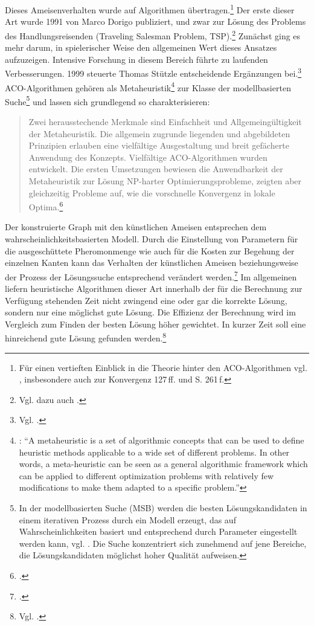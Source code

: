 Dieses Ameisenverhalten wurde auf Algorithmen übertragen.\footnote{Für einen vertieften Einblick in die Theorie hinter den ACO-Algorithmen vgl. \citet*[S. 121\,ff.]{ds-ant}, insbesondere auch zur Konvergenz 127\,ff. und S. 261\,f.} Der erste dieser Art wurde 1991 von Marco Dorigo publiziert, und zwar zur Lösung des Problems des Handlungsreisenden (Traveling Salesman Problem, TSP).\footnote{Vgl. dazu auch \citet*[S. 65\,ff.]{ds-ant}.} Zunächst ging es mehr darum, in spielerischer Weise den allgemeinen Wert dieses Ansatzes aufzuzeigen. Intensive Forschung in diesem Bereich führte zu laufenden Verbesserungen. 1999 steuerte Thomas Stützle entscheidende Ergänzungen bei.\footnote{Vgl. \citet*{ds-ant, wiki-antalg}.} ACO-Algorithmen gehören als Metaheuristik\footnote{\citet*[S. 62]{ds-ant}: \enquote{A metaheuristic is a set of algorithmic concepts that can be used to define heuristic methods applicable to a wide set of different problems. In other words, a meta-heuristic can be seen as a general algorithmic framework which can be applied to different optimization problems with relatively few modifications to make them adapted to a specific problem.}} zur Klasse der modellbasierten Suche\footnote{In der modellbasierten Suche (MSB) werden die besten Lösungskandidaten in einem iterativen Prozess durch ein Modell erzeugt, das auf Wahrscheinlichkeiten basiert und entsprechend durch Parameter eingestellt werden kann, vgl. \citet*[S. 138\,ff.]{ds-ant}. Die Suche konzentriert sich zunehmend auf jene Bereiche, die Lösungskandidaten möglichst hoher Qualität aufweisen.} und lassen sich grundlegend so charakterisieren: \blockquote{Zwei herausstechende Merkmale sind Einfachheit und Allgemeingültigkeit der Metaheuristik. Die allgemein zugrunde liegenden und abgebildeten Prinzipien erlauben eine vielfältige Ausgestaltung und breit gefächerte Anwendung des Konzepts. Vielfältige ACO-Algorithmen wurden entwickelt. Die ersten Umsetzungen bewiesen die Anwendbarkeit der Metaheuristik zur Lösung NP-harter Optimierungsprobleme, zeigten aber gleichzeitig Probleme auf, wie die vorschnelle Konvergenz in lokale Optima.\footnote{\citet*[S. 19]{sch-koa}.}}

\noindent
Der konstruierte Graph mit den künstlichen Ameisen entsprechen dem wahrscheinlichkeitsbasierten Modell. Durch die Einstellung von Parametern für die ausgeschüttete Pheromonmenge wie auch für die Kosten zur Begehung der einzelnen Kanten kann das Verhalten der künstlichen Ameisen beziehungsweise der Prozess der Lösungssuche entsprechend verändert werden.\footnote{\citet*[Vgl.][S. 151]{ds-ant}.} Im allgemeinen liefern heuristische Algorithmen dieser Art innerhalb der für die Berechnung zur Verfügung stehenden Zeit nicht zwingend eine oder gar die korrekte Lösung, sondern nur eine möglichst gute Lösung. Die Effizienz der Berechnung wird im Vergleich zum Finden der besten Lösung höher gewichtet. In kurzer Zeit soll eine hinreichend gute Lösung gefunden werden.\footnote{Vgl. \citet*[S. 25\,ff.]{ds-ant}.}

